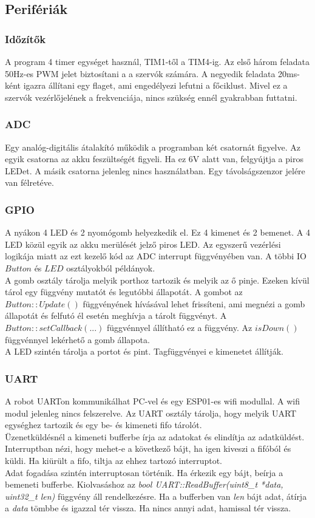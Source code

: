 \documentclass{article}
\begin{document}
\subsection{Perifériák}
\subsubsection{Időzítők}
A program 4 timer egységet használ, TIM1-től a TIM4-ig. Az első három feladata 50Hz-es PWM jelet biztosítani a a szervók számára. A negyedik feladata 20ms-ként igazra állítani egy flaget, ami engedélyezi lefutni a főciklust. Mivel ez a szervók vezérlőjelének a frekvenciája, nincs szükség ennél gyakrabban futtatni.
\subsubsection{ADC}
Egy analóg-digitális átalakító működik a programban két csatornát figyelve. Az egyik csatorna az akku feszültségét figyeli. Ha ez 6V alatt van, felgyújtja a piros LEDet. A másik csatorna jelenleg nincs használatban. Egy távolságszenzor jelére van félretéve.
\subsubsection{GPIO}
A nyákon 4 LED és 2 nyomógomb helyezkedik el. Ez 4 kimenet és 2 bemenet. A 4 LED közül egyik az akku merülését jelző piros LED. Az egyszerű vezérlési logikája miatt az ezt kezelő kód az ADC interrupt függvényében van. A többi IO $Button$ és $LED$ osztályokból példányok.\\
A gomb osztály tárolja melyik porthoz tartozik és melyik az ő pinje. Ezeken kívül tárol egy függvény mutatót és legutóbbi állapotát. A gombot az $Button::Update()$ függvényének hívásával lehet frissíteni, ami megnézi a gomb állapotát és felfutó él esetén meghívja a tárolt függvényt. A $Button::setCallback(...)$ függvénnyel állítható ez a függvény. Az $isDown()$ függvénnyel lekérhető a gomb állapota.\\
A LED szintén tárolja a portot és pint. Tagfüggvényei e kimenetet állítják.
\subsubsection{UART}
A robot UARTon kommunikálhat PC-vel és egy ESP01-es wifi modullal. A wifi modul jelenleg nincs felszerelve. Az UART osztály tárolja, hogy melyik UART egységhez tartozik és egy be- és kimeneti fifo tárolót.\\
Üzenetküldésnél a kimeneti bufferbe írja az adatokat és elindítja az adatküldést. Interruptban nézi, hogy mehet-e a következő bájt, ha igen kiveszi a fifóból és küldi. Ha kiürült a fifo, tiltja az ehhez tartozó interruptot.\\
Adat fogadása szintén interruptosan történik. Ha érkezik egy bájt, beírja a bemeneti bufferbe. Kiolvasáshoz az \textit{bool UART::ReadBuffer(uint8\_t *data, uint32\_t len)} függvény áll rendelkezésre. Ha a bufferben van \textit{len} bájt adat, átírja a \textit{data} tömbbe és igazzal tér vissza. Ha nincs annyi adat, hamissal tér vissza.
\end{document}
